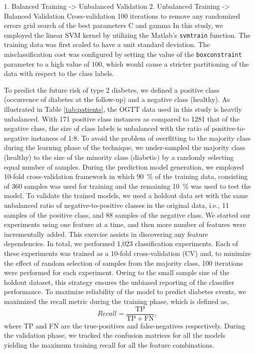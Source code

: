 \documentclass[journal,comsoc]{IEEEtran}
\renewcommand{\^}{\hat}  %
\begin{document}
1. Balanced Training -> Unbalanced Validation
2. Unbalanced Training -> Balanced Validation
%
Cross-validation
100 iterations to remove any randomized errors
grid search of the best parameters C and gamma
%
In this study, we employed the linear SVM kernel by utilizing the Matlab's \texttt{svmtrain} function. The training data was first scaled to have a unit standard deviation. The misclassification cost was configured by setting the value of the \texttt{boxconstraint} parameter to a high value of \num{100}, which would cause a stricter partitioning of the data with respect to the class labels.

To predict the future risk of type 2 diabetes, we defined a positive class (occurrence of diabetes at the follow-up) and a negative class (healthy). As illustrated in Table \ref{tab:patients}, the OGTT data used in this study is heavily unbalanced. With \num{171} positive class instances as compared to \num{1281} that of the negative class, the size of class labels is unbalanced with the ratio of positive-to-negative instances of 1:8. To avoid the problem of overfitting to the majority class during the learning phase of the technique, we under-sampled the majority class (healthy) to the size of the minority class (diabetic) by a randomly selecting equal number of samples. During the prediction model generation, we employed 10-fold cross-validation framework in which \SI{90}{\percent} of the training data, consisting of \num{360} samples was used for training and the remaining \SI{10}{\percent} was used to test the model. To validate the trained models, we used a holdout data set with the same unbalanced ratio of negative-to-positive classes in the original data, i.e., \num{11} samples of the positive class, and \num{88} samples of the negative class. We started our experiments using one feature at a time, and then more number of features were incrementally added. This exercise assists in discovering any feature dependencies. In total, we performed 1,023 classification experiments.  Each of these experiments was trained as a 10-fold cross-validation (CV) and, to minimize the effect of random selection of samples from the majority class, \num{100} iterations were performed for each experiment. Owing to the small sample size of the holdout dataset, this strategy ensures the unbiased reporting of the classifier performance. To maximize reliability of the model to predict diabetes events, we maximized the recall metric during the training phase, which is defined as,
%
\begin{equation}
  Recall = \frac{\mathrm{TP}}{\mathrm{TP} + \mathrm{FN}},
\end{equation}
%
where TP and FN are the true-positives and false-negatives respectively. During the validation phase, we tracked the confusion matrices for all the models yielding the maximum training recall for all the feature combinations.
\end{document}
